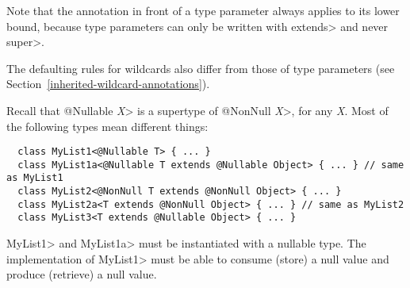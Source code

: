 \noindent
Note that the annotation in front of a type parameter always applies to its
lower bound, because type parameters can only be written with \<extends>
and never \<super>.



The defaulting rules for
wildcards also differ from those of type parameters (see
Section~\ref{inherited-wildcard-annotations}).


%
%
%
%



Recall that \<@Nullable \emph{X}> is a supertype of \<@NonNull \emph{X}>,
for any \emph{X}\@.
Most of the following types mean different things:

\begin{Verbatim}
  class MyList1<@Nullable T> { ... }
  class MyList1a<@Nullable T extends @Nullable Object> { ... } // same as MyList1
  class MyList2<@NonNull T extends @NonNull Object> { ... }
  class MyList2a<T extends @NonNull Object> { ... } // same as MyList2
  class MyList3<T extends @Nullable Object> { ... }
\end{Verbatim}

\<MyList1> and \<MyList1a> must be instantiated with a nullable type.
The implementation of \<MyList1> must be able to consume (store) a null
value and produce (retrieve) a null value.

